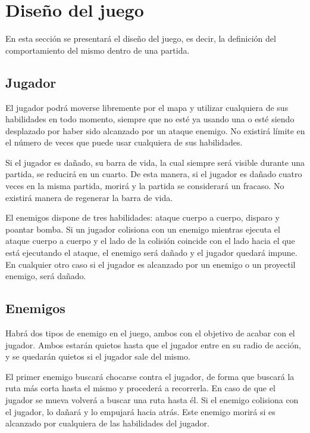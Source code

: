 \section{Diseño del juego}

	En esta sección se presentará el diseño del juego, es decir, la definición del comportamiento del mismo dentro de una partida.

	\subsection{Jugador}

		El jugador podrá moverse libremente por el mapa y utilizar cualquiera de sus habilidades en todo momento, siempre que no esté ya usando una o esté siendo desplazado por haber sido alcanzado por un ataque enemigo. No existirá límite en el número de veces que puede usar cualquiera de sus habilidades.

		Si el jugador es dañado, su barra de vida, la cual siempre será visible durante una partida, se reducirá en un cuarto. De esta manera, si el jugador es dañado cuatro veces en la misma partida, morirá y la partida se considerará un fracaso. No existirá manera de regenerar la barra de vida.

		El enemigos dispone de tres habilidades: ataque cuerpo a cuerpo, disparo y poantar bomba. Si un jugador colisiona con un enemigo mientras ejecuta el ataque cuerpo a cuerpo y el lado de la colisión coincide con el lado hacia el que está ejecutando el ataque, el enemigo será dañado y el jugador quedará impune. En cualquier otro caso si el jugador es alcanzado por un enemigo o un proyectil enemigo, será dañado.

	\subsection{Enemigos}

		Habrá dos tipos de enemigo en el juego, ambos con el objetivo de acabar con el jugador. Ambos estarán quietos hasta que el jugador entre en su radio de acción, y se quedarán quietos si el jugador sale del mismo.

		El primer enemigo buscará chocarse contra el jugador, de forma que buscará la ruta más corta hasta el mismo y procederá a recorrerla. En caso de que el jugador se mueva volverá a buscar una ruta hasta él. Si el enemigo colisiona con el jugador, lo dañará y lo empujará hacia atrás. Este enemigo morirá si es alcanzado por cualquiera de las habilidades del jugador.

